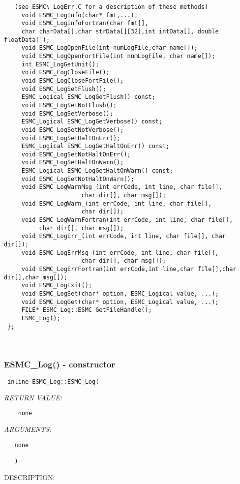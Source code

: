 \begin{verbatim}   (see ESMC\_LogErr.C for a description of these methods)
     void ESMC_LogInfo(char* fmt,...);   
     void ESMC_LogInfoFortran(char fmt[],
     char charData[],char strData[][32],int intData[], double floatData[]);
     void ESMC_LogOpenFile(int numLogFile,char name[]);
     void ESMC_LogOpenFortFile(int numLogFile, char name[]);
     int ESMC_LogGetUnit();
     void ESMC_LogCloseFile();
     void ESMC_LogCloseFortFile();
     void ESMC_LogSetFlush();
     ESMC_Logical ESMC_LogGetFlush() const;
     void ESMC_LogSetNotFlush();
     void ESMC_LogSetVerbose();
     ESMC_Logical ESMC_LogGetVerbose() const;
     void ESMC_LogSetNotVerbose();
     void ESMC_LogSetHaltOnErr();
     ESMC_Logical ESMC_LogGetHaltOnErr() const;
     void ESMC_LogSetNotHaltOnErr();
     void ESMC_LogSetHaltOnWarn();
     ESMC_Logical ESMC_LogGetHaltOnWarn() const;
     void ESMC_LogSetNotHaltOnWarn();
     void ESMC_LogWarnMsg_(int errCode, int line, char file[],
                      char dir[], char msg[]);
     void ESMC_LogWarn_(int errCode, int line, char file[],
                      char dir[]);
     void ESMC_LogWarnFortran(int errCode, int line, char file[],
          char dir[], char msg[]);
     void ESMC_LogErr_(int errCode, int line, char file[], char dir[]);
     void ESMC_LogErrMsg_(int errCode, int line, char file[],
                      char dir[], char msg[]);
     void ESMC_LogErrFortran(int errCode,int line,char file[],char dir[],char msg[]);
     void ESMC_LogExit();
     void ESMC_LogSet(char* option, ESMC_Logical value, ...);
     void ESMC_LogGet(char* option, ESMC_Logical value, ...);
     FILE* ESMC_Log::ESMC_GetFileHandle();
     ESMC_Log();
 };\end{verbatim}
 
 
\mbox{}\hrulefill\ 
 

  \subsubsection [ESMC\_Log()] {ESMC\_Log() - constructor}


\begin{verbatim} 
 inline ESMC_Log::ESMC_Log(\end{verbatim}{\em RETURN VALUE:}
\begin{verbatim}    none\end{verbatim}{\em ARGUMENTS:}
\begin{verbatim}   none
    
   )
 \end{verbatim}
{\sf DESCRIPTION:\\ }


